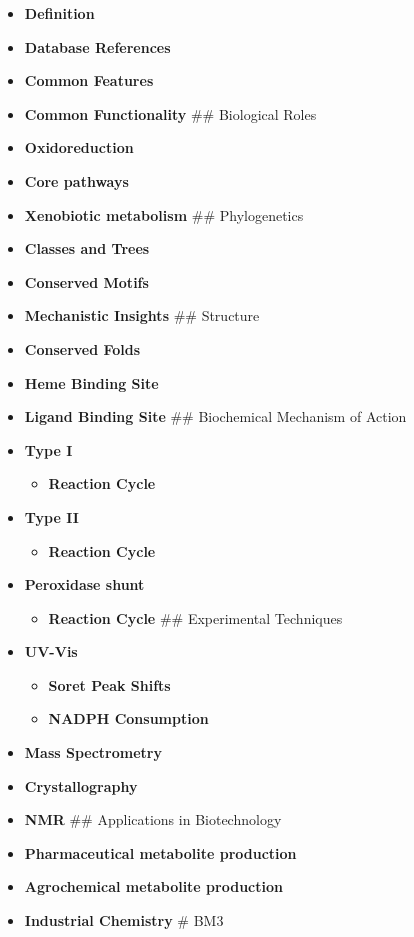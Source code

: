 \begin{itemize}
\tightlist
\item
  \textbf{Definition}
\item
  \textbf{Database References}
\item
  \textbf{Common Features}
\item
  \textbf{Common Functionality} \#\# Biological Roles
\item
  \textbf{Oxidoreduction}
\item
  \textbf{Core pathways}
\item
  \textbf{Xenobiotic metabolism} \#\# Phylogenetics
\item
  \textbf{Classes and Trees}
\item
  \textbf{Conserved Motifs}
\item
  \textbf{Mechanistic Insights} \#\# Structure
\item
  \textbf{Conserved Folds}
\item
  \textbf{Heme Binding Site}
\item
  \textbf{Ligand Binding Site} \#\# Biochemical Mechanism of Action
\item
  \textbf{Type I}

  \begin{itemize}
  \tightlist
  \item
    \textbf{Reaction Cycle}
  \end{itemize}
\item
  \textbf{Type II}

  \begin{itemize}
  \tightlist
  \item
    \textbf{Reaction Cycle}
  \end{itemize}
\item
  \textbf{Peroxidase shunt}

  \begin{itemize}
  \tightlist
  \item
    \textbf{Reaction Cycle} \#\# Experimental Techniques
  \end{itemize}
\item
  \textbf{UV-Vis}

  \begin{itemize}
  \tightlist
  \item
    \textbf{Soret Peak Shifts}
  \item
    \textbf{NADPH Consumption}
  \end{itemize}
\item
  \textbf{Mass Spectrometry}
\item
  \textbf{Crystallography}
\item
  \textbf{NMR} \#\# Applications in Biotechnology
\item
  \textbf{Pharmaceutical metabolite production}
\item
  \textbf{Agrochemical metabolite production}
\item
  \textbf{Industrial Chemistry} \# BM3
\end{itemize}


